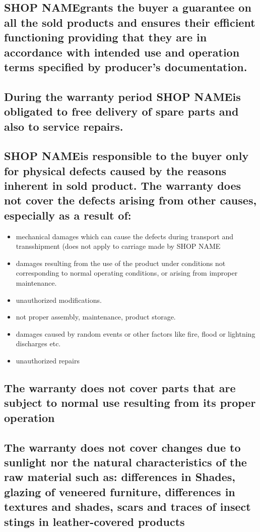 \documentclass[10pt,a4paper]{article}
\newcommand{\shopname}{SHOP NAME}
\begin{document}
\subsection{\shopname grants the buyer a guarantee on all the sold products and ensures their efficient functioning providing that they are in accordance with intended use and operation terms specified by producer’s documentation.}

\subsection {During the warranty period \shopname is obligated to free delivery of spare parts and also to service repairs.}
\subsection{ \shopname is responsible to the buyer only for physical defects caused by the reasons inherent in sold product. The warranty does not cover the defects arising from other causes, especially as a result of:}

\begin{itemize}

\item mechanical damages which can cause the defects during transport and transshipment (does not apply to carriage made by \shopname
\item damages resulting from the use of the product under conditions not corresponding to normal operating conditions, or arising from improper maintenance.
\item unauthorized modifications.
\item not proper assembly, maintenance, product storage.
\item damages caused by random events or other factors like fire, flood or lightning discharges etc.
\item unauthorized repairs

\end{itemize}

\subsection{The warranty does not cover parts that are subject to normal use resulting from its proper operation}
\subsection{The warranty does not cover changes due to sunlight nor the natural characteristics of the raw material such as: differences in Shades, glazing of veneered furniture, differences in textures and shades, scars and traces of insect stings in leather-covered products}
\end{document}
